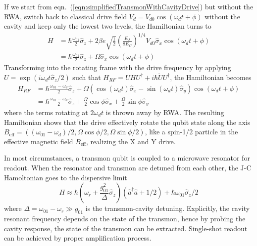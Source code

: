             If we start from eqn.~(\ref{eqn:simplifiedTransmonWithCavityDrive}) but without the RWA, switch back to classical drive field $V_d = V_{d0}\cos(\omega_d t + \phi) $ without the cavity and keep only the lowest two levels, the Hamiltonian turns to
            \begin{align}
                H &= \hbar \frac{\omega_{01}}{2} \hat \sigma_z + 2 \beta e \sqrt{ \frac{1}{2}} \left ( \frac{E_J}{8E_C} \right )^{1/4} V_{d0} \hat \sigma_x \cos(\omega_d t + \phi) \\
                &=   \hbar \frac{\omega_{01}}{2} \hat \sigma_z + \Omega \hat \sigma_x \cos(\omega_d t + \phi)
            \end{align}
            Transforming into the rotating frame with the drive frequency by applying $ U = \exp(i \omega_d t \hat \sigma_z /2) $ such that $ H_{RF} = UHU^\dagger + i\hbar \dot U U^\dagger $, the Hamiltonian becomes
            \begin{align}
                H_{RF} &= \hbar \frac{\omega_{01} - \omega_d}{2} \hat \sigma_z + \Omega ( \cos (\omega_d t) \hat \sigma_x - \sin (\omega_d t) \hat \sigma_y )\cos(\omega_d t + \phi)\\
                & = \hbar \frac{\omega_{01} - \omega_d}{2} \hat \sigma_z + \frac{\Omega}{2} \cos \phi \hat \sigma_x+ \frac{\Omega}{2} \sin \phi \hat \sigma_y
            \end{align}
            where the terms rotating at $ 2 \omega_d t $ is thrown away by RWA. The resulting Hamiltonian shows that the drive effectively rotate the qubit state along the axis $B_{\text{eff}} = ((\omega_{01} - \omega_d)/2,\Omega \cos \phi /2,\Omega \sin \phi /2)$, like a spin-1/2 particle in the effective magnetic field $B_{\text{eff}}$, realizing the X and Y drive.

            In most circumstances, a transmon qubit is coupled to a microwave resonator for readout. When the resonator and transmon are detuned from each other, the J-C Hamoltonian goes to the dispersive limit\cite{Blais2004,schuster2007circuit}
            \begin{equation}
                H \approx \hbar \left (\omega_r + \frac{g_{01}^2}{\Delta} \hat \sigma_z \right )(\hat a^\dagger \hat a+1/2)+\hbar \omega_{01} \hat \sigma_z/2
            \end{equation}
            where $ \Delta = \omega_{01} - \omega_r \gg g_{01}$ is the transmon-cavity detuning. Explicitly, the cavity resonant frequency depends on the state of the transmon, hence by probing the cavity response, the state of the transmon can be extracted. Single-shot readout can be achieved by proper amplification process\cite{Mallet2009,Sliwa2016}.


